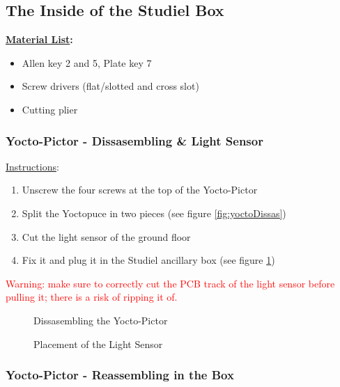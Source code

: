 \newpage
\clearpage

\subsection{The Inside of the Studiel Box}
\vspace{10pt}

\noindent\textbf{\underline{Material List}:}
\begin{itemize}
	\item Allen key 2 and 5, Plate key 7
	\item Screw drivers (flat/slotted and cross slot) 
	\item Cutting plier
\end{itemize}

\subsubsection{Yocto-Pictor - Dissasembling \& Light Sensor}

\underline{Instructions}:

\begin{enumerate}
	\item Unscrew the four screws at the top of the Yocto-Pictor
	\item Split the Yoctopuce in two pieces (see figure \ref{fig:yoctoDissas})
	\item Cut the light sensor of the ground floor
	\item Fix it and plug it in the Studiel ancillary box (see figure
		\ref{fig:lightSensor})
\end{enumerate}
\textcolor{red}{Warning: make sure to correctly cut the PCB track of the light 
sensor before pulling it; there is a risk of ripping it of.}

\begin{figure}[!ht]
  \centering
  \begin{minipage}[b]{0.49\textwidth}
	  \caption{Dissasembling the Yocto-Pictor}
	\label{fig:yoctoDissas}
  \end{minipage}
  \hfill
  \begin{minipage}[b]{0.49\textwidth}
	  \caption{Placement of the Light Sensor}
	\label{fig:lightSensor}
  \end{minipage}
\end{figure}

\clearpage
\subsubsection{Yocto-Pictor - Reassembling in the Box}

